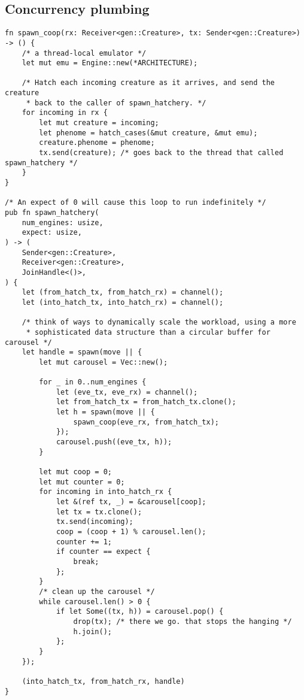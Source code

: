 \documentclass[11pt]{article}
\begin{document}
\subsection{Concurrency plumbing}
\label{sec:org7349e1d}
\lstset{language=rust,label=orgb825d8e,caption= ,captionpos=b,numbers=none}
\begin{lstlisting}
fn spawn_coop(rx: Receiver<gen::Creature>, tx: Sender<gen::Creature>) -> () {
    /* a thread-local emulator */
    let mut emu = Engine::new(*ARCHITECTURE);

    /* Hatch each incoming creature as it arrives, and send the creature
     * back to the caller of spawn_hatchery. */
    for incoming in rx {
        let mut creature = incoming;
        let phenome = hatch_cases(&mut creature, &mut emu);
        creature.phenome = phenome;
        tx.send(creature); /* goes back to the thread that called spawn_hatchery */
    }
}

/* An expect of 0 will cause this loop to run indefinitely */
pub fn spawn_hatchery(
    num_engines: usize,
    expect: usize,
) -> (
    Sender<gen::Creature>,
    Receiver<gen::Creature>,
    JoinHandle<()>,
) {
    let (from_hatch_tx, from_hatch_rx) = channel();
    let (into_hatch_tx, into_hatch_rx) = channel();

    /* think of ways to dynamically scale the workload, using a more
     * sophisticated data structure than a circular buffer for carousel */
    let handle = spawn(move || {
        let mut carousel = Vec::new();

        for _ in 0..num_engines {
            let (eve_tx, eve_rx) = channel();
            let from_hatch_tx = from_hatch_tx.clone();
            let h = spawn(move || {
                spawn_coop(eve_rx, from_hatch_tx);
            });
            carousel.push((eve_tx, h));
        }

        let mut coop = 0;
        let mut counter = 0;
        for incoming in into_hatch_rx {
            let &(ref tx, _) = &carousel[coop];
            let tx = tx.clone();
            tx.send(incoming);
            coop = (coop + 1) % carousel.len();
            counter += 1;
            if counter == expect {
                break;
            };
        }
        /* clean up the carousel */
        while carousel.len() > 0 {
            if let Some((tx, h)) = carousel.pop() {
                drop(tx); /* there we go. that stops the hanging */
                h.join();
            };
        }
    });

    (into_hatch_tx, from_hatch_rx, handle)
}
\end{lstlisting}
\end{document}

